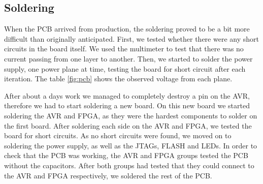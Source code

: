 \subsection{Soldering}


When the \ac{PCB} arrived from production, the soldering proved
to be a bit more difficult than originally anticipated.
First, we tested whether
there were any short circuits in the board itself. We used the multimeter to test that
there was no current passing from one layer to another. Then, we started to solder the power supply, one power plane at time, testing the board for short
circuit after each iteration. The table \ref{fig:pcb} shows the observed voltage from each plane.




After about a days work we managed to completely destroy a pin on the AVR,
therefore we had to start soldering a new board. On this new board we
started soldering the AVR and \ac{FPGA}, as they were the hardest components to
solder on the first board. After soldering each side on the AVR and \ac{FPGA}, 
we tested the board for short circuits. As no short circuits were found, 
we moved on to soldering the power supply, as well as the \acp{JTAG}, FLASH 
and \acp{LED}. In order to check that the \ac{PCB} was working, the
AVR and \ac{FPGA} groups tested the \ac{PCB} without the capacitors. 
After both groups had tested that they could connect to the AVR and \ac{FPGA}
respectively, we soldered the rest of the \ac{PCB}.
